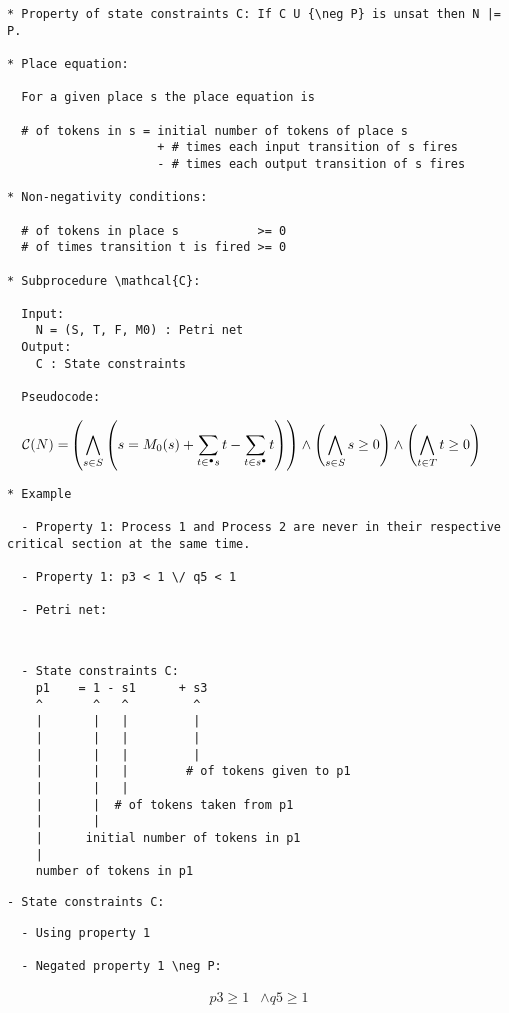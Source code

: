 \begin{verbatim}
* Property of state constraints C: If C U {\neg P} is unsat then N |= P.

* Place equation:
  
  For a given place s the place equation is

  # of tokens in s = initial number of tokens of place s
                     + # times each input transition of s fires
                     - # times each output transition of s fires

* Non-negativity conditions:

  # of tokens in place s           >= 0
  # of times transition t is fired >= 0

* Subprocedure \mathcal{C}:

  Input:
    N = (S, T, F, M0) : Petri net
  Output:
    C : State constraints

  Pseudocode:

\end{verbatim}

\begin{align*}
  \mathcal{C}(N) =& \left( \bigwedge_{s \in S} \left(
    s = M_0(s) + \sum_{t \in \prescript{\bullet}{}{s}} t - \sum_{t \in s^{\bullet}} t
  \right) \right) \land
    \left( \bigwedge_{s \in S} s \ge 0 \right) \land
    \left( \bigwedge_{t \in T} t \ge 0 \right)
\end{align*}

\newpage

\begin{verbatim}
* Example

  - Property 1: Process 1 and Process 2 are never in their respective critical section at the same time.

  - Property 1: p3 < 1 \/ q5 < 1

  - Petri net:

\end{verbatim}

% 

\newpage

\begin{verbatim}
  
\end{verbatim}

\begin{verbatim}
  - State constraints C:
    p1    = 1 - s1      + s3
    ^       ^   ^         ^
    |       |   |         |
    |       |   |         |
    |       |   |         |
    |       |   |        # of tokens given to p1
    |       |   |    
    |       |  # of tokens taken from p1
    |       |
    |      initial number of tokens in p1
    |
    number of tokens in p1
\end{verbatim}

\begin{verbatim}
- State constraints C:
\end{verbatim}



\begin{verbatim}
  - Using property 1
  
  - Negated property 1 \neg P:
\end{verbatim}

\begin{align*}
     p3 \ge 1 & \land q5 \ge 1
\end{align*}

